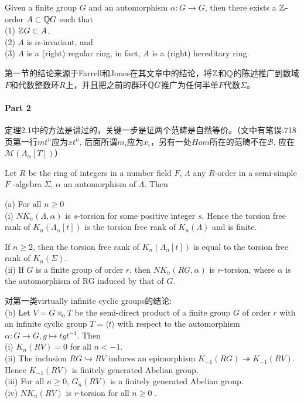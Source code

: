 \begin{theorem}
Given a  finite  group  $G$  and  an automorphism  $\alpha: G \rightarrow  G$, then there  exists  a  $\mathbb{Z}$-order  $A \subset \mathbb{Q} G$  such that \\
(1) $\mathbb{Z} G\subset A$, \\
(2) $A$  is  $\alpha$-invariant,  and \\
(3) $A$  is  a  (right) {\color{red}regular}  ring,  in fact,  $A$  is  a  (right) hereditary  ring. 
\end{theorem}
第一节的结论来源于Farrell和Jones在其文章中的结论，将$\mathbb{Z}$和$\mathbb{Q}$的陈述推广到数域$F$和代数整数环$R$上，并且把之前的群环$\mathbb{Q} G$推广为任何半单$F$代数$\Sigma$。
\paragraph{Part 2}
定理2.1中的方法是讲过的，关键一步是证两个范畴是自然等价。（文中有笔误:718页第一行$mt^n$应为$xt^n$, 后面所谓$m_i$应为$x_i$，另有一处$Hom$所在的范畴不在$\mathcal{B}$, 应在$\mathcal{M}(A_\alpha[T])$）
\begin{theorem}[2.2]
Let $R$ be the ring of integers in a number field $F$, $\Lambda$ any $R$-order
in a semi-simple $F$ -algebra $\Sigma$, $\alpha$ an automorphism of $\Lambda$. Then

(a) For all $n \geq 0$\\
(i) $NK_n(\Lambda,\alpha)$ is $s$-torsion for some positive integer $s$. Hence the torsion free
rank of $K_n(\Lambda_\alpha[t])$ is the torsion free rank of $K_n(\Lambda)$ and is finite.

 If $n \geq 2$, then the torsion free rank of $K_n(\Lambda_\alpha[t])$ is equal to the torsion free rank of $K_n(\Sigma)$.\\
(ii) If $G$ is a finite group of order $r$, then $NK_n(RG, \alpha)$ is $r$-torsion, where $\alpha$ is the automorphism of RG induced by that of $G$.

对第一类virtually infinite cyclic groups的结论: \\
(b) Let $V = G \rtimes_\alpha T$ be the semi-direct product of a finite group $G$ of order $r$ with an infinite cyclic group $T =\langle t\rangle$ with respect to the automorphism $\alpha : G\longrightarrow G , g \mapsto tgt^{-1}$. Then\\
(i) $K_n(RV) = 0$ for all $ n< -1$.\\
(ii) The inclusion $RG \hookrightarrow RV$ induces an epimorphism $K_{-1}(RG) \twoheadrightarrow K_{-1}
(RV)$. Hence $K_{-1}(RV)$ is finitely generated Abelian group.\\
(iii) For all $ n \geq 0$, $G_n(RV)$ is a finitely generated Abelian group.\\
(iv) $NK_n(RV ) $ is $r$-torsion for all $n \geq 0$ .
\end{theorem}


